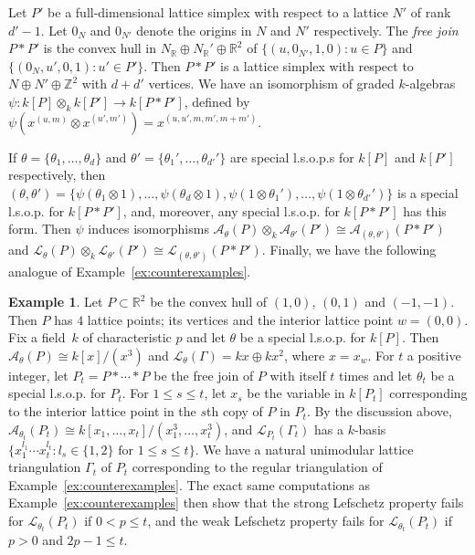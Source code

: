 \documentclass[11pt]{article}
\theoremstyle{definition}
\newtheorem{example}[theo]{Example}
\numberwithin{equation}{section}
\def\R{\mathbb{R}}
\def\Z{\mathbb{Z}}
\numberwithin{equation}{section}
\begin{document}
Let $P'$ be a full-dimensional lattice simplex with respect to a lattice $N'$ of rank~\mbox{$d' - 1$}. Let $0_N$ and $0_{N'}$ denote the origins in $N$ and $N'$ respectively. 
The \emph{free join} $P*P'$ is the 
convex hull in $N_\R \oplus N_\R' \oplus \R^2$ of $\{ (u,0_{N'},1,0) : u \in P \}$ and $\{ (0_{N},u',0,1) : u' \in P' \}$. Then $P*P'$ is a 
lattice simplex  with respect to $N \oplus N' \oplus \Z^2$ with $d + d'$ vertices. We have an isomorphism of graded $k$-algebras $\psi \colon  k[P] \otimes_k k[P'] \to k[P * P']$, defined by $\psi(x^{(u,m)} \otimes x^{(u',m')}) = x^{(u,u',m,m',m + m')}$. 
	
	If $\theta = \{ \theta_1,\ldots,\theta_d \}$ and $\theta' = \{ \theta_1',\ldots,\theta_{d'}'\}$ are special l.s.o.p.s for $k[P]$ and $k[P']$ respectively, then $(\theta,\theta') = \{ \psi(\theta_1 \otimes 1), \ldots,  \psi(\theta_d \otimes 1), \psi(1 \otimes \theta_1'), \ldots, \psi(1 \otimes \theta_{d'}') \}$ is a special l.s.o.p. for  $k[P * P']$, and,   moreover,  any special l.s.o.p. for $k[P * P']$ has this form. Then $\psi$ induces isomorphisms 
	$\mathscr{A}_\theta(P) \otimes_k \mathscr{A}_{\theta'}(P') \cong 
	\mathscr{A}_{(\theta,\theta')}(P*P')$ and 
	$\mathscr{L}_\theta(P) \otimes_k \mathscr{L}_{\theta'}(P') \cong 
\mathscr{L}_{(\theta,\theta')}(P*P')$. Finally, we have the following analogue of Example~\ref{ex:counterexamples}. 

\begin{example}\label{ex:ehrhart}
Let $P \subset \R^2$ be the convex hull of $(1,0)$, $(0,1)$ and $(-1,-1)$. Then $P$ has $4$ lattice points; its vertices and the interior lattice point $w = (0,0)$. 
Fix a field~$k$ of characteristic $p$ and let $\theta$ be a special l.s.o.p. for $k[P]$. 
Then $\mathscr{A}_\theta(P) \cong k[x]/(x^3)$ and $\mathscr{L}_\theta(\Gamma) = k x \oplus k x^2$, where $x = x_w$. 
For $t$ a positive integer, let $P_t = P * \cdots * P$ be the free join of $P$ with itself $t$ times and let $\theta_t$ be a special l.s.o.p. for $P_t$. 
For $1 \le s \le t$,  let $x_s$ be the variable in $k[P_t]$ corresponding to the interior lattice point in the $s$th copy of $P$ in $P_t$. 
By the discussion above,
$\mathscr{A}_{\theta_t}(P_t) \cong k[x_1,\ldots,x_t]/(x_1^3,\ldots,x_t^3)$, and 
$\mathscr{L}_{P_t}(\Gamma_t)$ has a $k$-basis $\{ x_1^{l_1}\cdots x_t^{l_t} : l_s \in \{ 1,2 \} \textrm{ for } 1 \le s \le t \}$.
We have a natural unimodular lattice triangulation $\Gamma_t$ of $P_t$ corresponding to the regular triangulation of Example~\ref{ex:counterexamples}.
The exact same computations as Example~\ref{ex:counterexamples} then show that 
the strong Lefschetz property fails for  $\mathscr{L}_{\theta_t}(P_t)$ if $0 < p \le t$, and the weak Lefschetz property fails for  $\mathscr{L}_{\theta_t}(P_t)$ if $p > 0$ and $2p - 1 \le t$.
\end{example}
\end{document}
